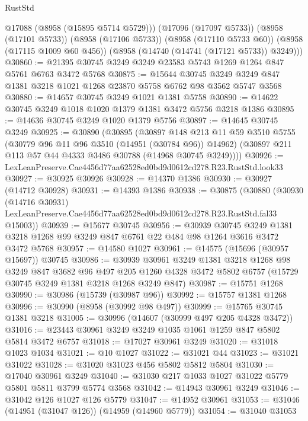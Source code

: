\begin{lexlean}{RustStd}
\begin{coremodule}
        @17088
        (@8958 (@15895 @5714 @5729)))
      (@17096 (@17097 @5733))
      (@8958 (@17101 @5733))
      (@8958 (@17106 @5733))
      (@8958 (@17110 @5733 @60))
      (@8958 (@17115 @1009 @60 @456))
      (@8958 (@14740 (@14741 (@17121 @5733)) @3249)))
@30860 := @21395 @30745 @3249 @3249 @23583 @5743 @1269 @1264 @847 @5761 @6763 @3472 @5768
@30875 := @15644
    @30745
    @3249
    @3249
    @847
    @1381
    @3218
    @1021
    @1268
    @23870
    @5758
    @6762
    @98
    @3562
    @5747
    @3568
@30880 := @14657 @30745 @3249 @1021 @1381 @5758
@30890 := @14622 @30745 @3249 @1018 @1020 @1379 @1381 @3472 @5756 @3218 @1386
@30895 := @14636 @30745 @3249 @1020 @1379 @5756
@30897 := @14645 @30745 @3249
@30925 := @30890
    (@30895
      (@30897
        @148
        @213
        @11
        @59
        @3510
        @5755
        (@30779 @96 @11 @96 @3510 (@14951 (@30784 @96)) @14962)
        (@30897 @211 @113 @57 @44 @4333 @3486 @30788 (@14968 @30745 @3249))))
@30926 := LexLeanPreserve.Cae4456d77aa62528ed0bd9d0612cd278.R23.RustStd.look33
@30927 := @30925 @30926
@30928 := @14370 @1386
@30930 := @30927 (@14712 @30928)
@30931 := @14393 @1386
@30938 := @30875
    (@30880
      (@30930
        (@14716 @30931)
        LexLeanPreserve.Cae4456d77aa62528ed0bd9d0612cd278.R23.RustStd.fal33
        @15003))
@30939 := @15677 @30745
@30956 := @30939
    @30745
    @3249
    @1381
    @3218
    @1268
    @99
    @3249
    @847
    @6761
    @22
    @484
    @98
    @1264
    @3616
    @3472
    @3472
    @5768
@30957 := @14580 @1027
@30961 := @14575 (@15696 (@30957 @15697)) @30745
@30986 := @30939
    @30961
    @3249
    @1381
    @3218
    @1268
    @98
    @3249
    @847
    @3682
    @96
    @497
    @205
    @1260
    @4328
    @3472
    @5802
    @6757
    (@15729 @30745 @3249 @1381 @3218 @1268 @3249 @847)
@30987 := @15751 @1268
@30990 := @30986 (@15739 (@30987 @96))
@30992 := @15757 @1381 @1268
@30996 := @30990 (@8958 (@30992 @98 @497))
@30999 := @15765 @30745 @1381 @3218
@31005 := @30996 (@14607 (@30999 @497 @205 @4328 @3472))
@31016 := @23443 @30961 @3249 @3249 @1035 @1061 @1259 @847 @5802 @5814 @3472 @6757
@31018 := @17027 @30961 @3249
@31020 := @31018 @1023 @1034
@31021 := @10 @1027
@31022 := @31021 @44
@31023 := @31021 @31022
@31028 := @31020 @31023 @456 @5802 @5812 @5804
@31030 := @17040 @30961 @3249
@31040 := @31030 @217 @1033 @1027 @31022 @5779 @5801 @5811 @3799 @5774 @3568
@31042 := @14943 @30961 @3249
@31046 := @31042 @126 @1027 @126 @5779
@31047 := @14952 @30961
@31053 := @31046 (@14951 (@31047 @126)) (@14959 (@14960 @5779))
@31054 := @31040 @31053

\end{coremodule}
\end{lexlean}
